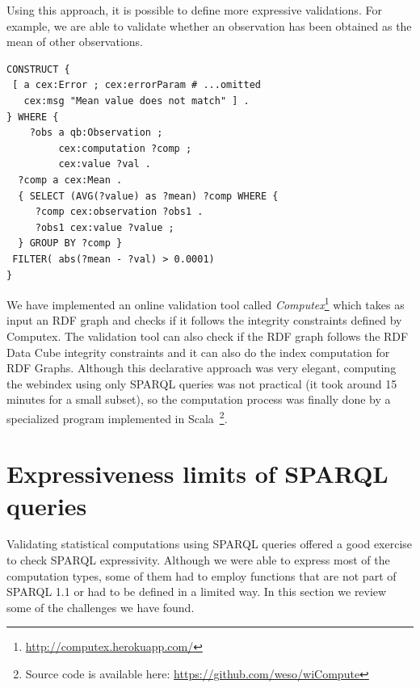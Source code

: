 \documentclass{llncs}
\begin{document}
Using this approach, it is possible to define more expressive validations.
For example, we are able to validate whether an observation has been obtained as
the mean of other observations. 

\begin{lstlisting}[style=SPARQL]
CONSTRUCT {
 [ a cex:Error ; cex:errorParam # ...omitted 
   cex:msg "Mean value does not match" ] . 
} WHERE { 
    ?obs a qb:Observation ;
         cex:computation ?comp ;
         cex:value ?val .
  ?comp a cex:Mean .
  { SELECT (AVG(?value) as ?mean) ?comp WHERE {
     ?comp cex:observation ?obs1 .
	 ?obs1 cex:value ?value ;
  } GROUP BY ?comp } 
 FILTER( abs(?mean - ?val) > 0.0001)
}
\end{lstlisting}

We have implemented an online validation tool called \emph{Computex}\footnote{\url{http://computex.herokuapp.com/}} which takes as
 input an RDF graph and checks if it follows the integrity constraints defined by Computex.
 The validation tool can also check if the RDF graph follows the RDF Data Cube integrity constraints
 and it can also do the index computation for RDF Graphs. 
 Although this declarative approach was very elegant, computing the webindex using only SPARQL queries
 was not practical (it took around 15 minutes for a small subset), so the computation process was finally done
 by a specialized program implemented in Scala~\footnote{Source code is available here: \url{https://github.com/weso/wiCompute}}. 
  
\section{Expressiveness limits of SPARQL queries}

Validating statistical computations using SPARQL queries offered 
 a good exercise to check SPARQL expressivity. Although we were able 
 to express most of the computation types, some of them had to employ functions
 that are not part of SPARQL 1.1 or had to be defined in a limited way. 
 In this section we review some of the challenges we have found.
\end{document}
